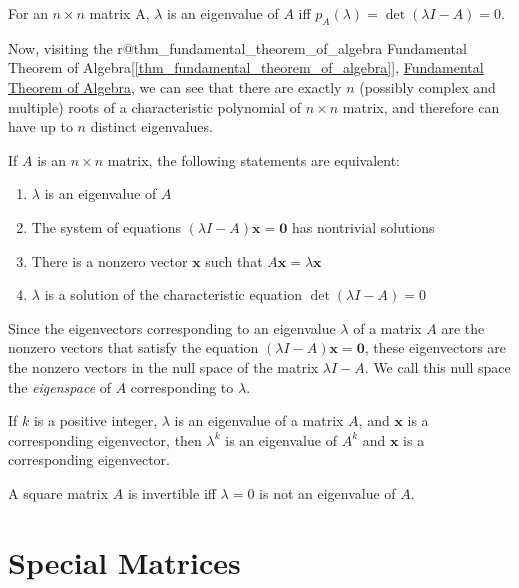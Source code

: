 \documentclass{report}
\begin{document}
		\begin{thm}
			For an $n \times n$ matrix A, $\lambda$ is an eigenvalue of $A$ iff $p_A(\lambda)=\det(\lambda I-A)=0$.
		\end{thm}
		
		Now, visiting the
		\ifcsname r@thm_fundamental_theorem_of_algebra \endcsname
		Fundamental Theorem of Algebra[\ref{thm_fundamental_theorem_of_algebra}],
		\else
		\href{https://en.wikipedia.org/wiki/Fundamental_theorem_of_algebra}{Fundamental Theorem of Algebra},
		\fi
		we can see that there are exactly $n$ (possibly complex and multiple) roots of a characteristic polynomial of $n \times n$ matrix, and therefore can have up to $n$ distinct eigenvalues.
		
		\begin{thm}
			If $A$ is an $n \times n$ matrix, the following statements are equivalent:
			\begin{enumerate}
				\item $\lambda$ is an eigenvalue of $A$
				\item The system of equations $(\lambda I-A)\bm{x}=\bm{0}$ has nontrivial solutions
				\item There is a nonzero vector $\bm{x}$ such that $A\bm{x}=\lambda \bm{x}$
				\item $\lambda$ is a solution of the characteristic equation $\det(\lambda I-A)=0$
			\end{enumerate}
		\end{thm}
		
		Since the eigenvectors corresponding to an eigenvalue $\lambda$ of a matrix $A$  are the nonzero vectors that satisfy the equation $(\lambda I-A)\bm{x}=\bm{0}$, these eigenvectors are the nonzero vectors in the null space of the matrix $\lambda I-A$. We call this null space the \emph{eigenspace} of $A$ corresponding to $\lambda$.
		
		\begin{thm}
			If $k$ is a positive integer, $\lambda$ is an eigenvalue of a matrix $A$, and $\bm{x}$ is a corresponding eigenvector, then $\lambda^k$ is an eigenvalue of $A^k$ and $\bm{x}$ is a corresponding eigenvector.
		\end{thm}
		
		\begin{thm}
			A square matrix $A$ is invertible iff $\lambda=0$ is not an eigenvalue of $A$.
		\end{thm}
	
	\section{Special Matrices}
\end{document}
